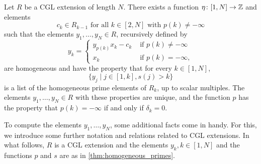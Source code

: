 \begin{theorem}\label{thm:homogeneous_primes}
	Let $R$ be a CGL extension of length $N$. There exists a function $\eta \colon [1, N] \to \mathbb{Z}$ and elements
	\begin{equation*}
		c_k \in R_{k-1} \text{ for all } k \in [2,N] \text{ with } p(k) \neq - \infty
	\end{equation*}
	such that the elements $y_1, \dots, y_N \in R$, recursively defined by
	\begin{equation*}
		y_k = \begin{cases}
			y_{p(k)}x_k - c_k & \text{ if } p(k) \neq -\infty \\
			x_k               & \text{ if } p(k) = -\infty,
		\end{cases}
	\end{equation*}
	are homogeneous and have the property that for every $k \in [1, N]$,
	\begin{equation}\label{eq:list_of_ys_in_R_k}
		\{y_j \mid j \in [1, k], s(j) > k\}
	\end{equation}
	is a list of the homogeneous prime elements of $R_k$, up to scalar multiples. The
	elements $y_1, \dots, y_N \in R$ with these properties are unique, and the function $p$
	has the property that $p(k) = - \infty$ if and only if $\delta_k = 0$.
\end{theorem}

To compute the elements $y_1, \dots, y_N$, some additional facts come in handy. For
this, we introduce some further notation and relations related to CGL extensions. In
what follows, $R$ is a CGL extension and the elements $y_k, k \in [1, N]$ and the
functions $p$ and $s$ are as in \cref{thm:homogeneous_primes}.

